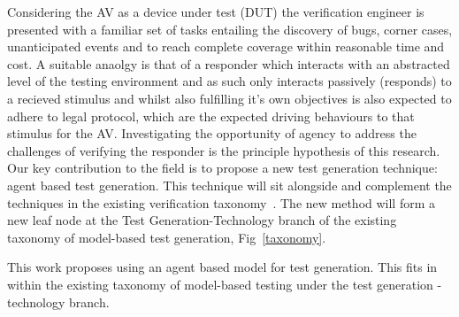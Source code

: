 \documentclass[letterpaper, 10 pt, journal, twoside]{IEEEtran}
\begin{document}
Considering the AV as a device under test (DUT) the verification engineer is presented with a familiar set of tasks entailing the discovery of bugs, corner cases, unanticipated events and to reach complete \cite{KE?} coverage within reasonable time and cost.
%
A suitable anaolgy is that of a responder which interacts with an abstracted level of the testing environment and as such only interacts passively (responds) to a recieved stimulus and whilst also fulfilling it's own objectives is also expected to adhere to legal protocol, which are the expected driving behaviours to that stimulus for the AV.
%
Investigating the opportunity of agency to address the challenges of verifying the responder is the principle hypothesis of this research.
Our key contribution to the field is to propose a new test generation technique: agent based test generation. 
This technique will sit alongside and complement the techniques in the existing verification taxonomy~\cite{utting2012taxonomy}. The new method will form a new leaf node at the Test Generation-Technology branch of the existing taxonomy of model-based test generation, Fig~\ref{taxonomy}.

This work proposes using an agent based model for test generation. This fits in within the existing taxonomy of model-based testing \cite{utting2012taxonomy} under the test generation - technology branch.

\end{document}

